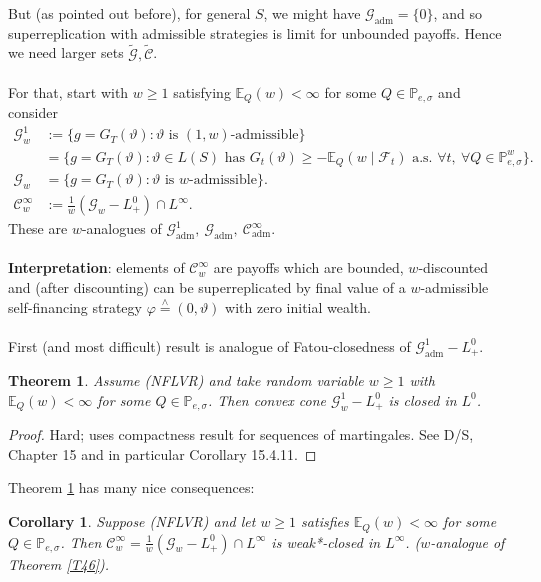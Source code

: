 \documentclass[12pt,a4paper, twoside]{article}
\newtheorem{thm}{Theorem}[section]
\newtheorem{cor}{Corollary}[section]
\theoremstyle{definition}
\newcommand{\EE}{\mathbb{E}} %
\newcommand{\PP}{\mathbb{P}} %
\newcommand{\teq}{\overset{\wedge}{=}}
\begin{document}
But (as pointed out before), for general $S$, we might have $\mathcal{G}_\text{adm}= \{0\}$, and so superreplication with admissible strategies is limit for unbounded payoffs. Hence we need larger sets $\widetilde{\mathcal{G}}, \widetilde{\mathcal{C}}$. \\
\\
For that, start with $w \geq 1$ satisfying $\EE_Q(w) < \infty$ for some $Q \in \PP_{e, \sigma}$ and consider 
\begin{align*}
\mathcal{G}_w^1 &:= \{ g = G_T( \vartheta) : \vartheta \text{ is $(1,w)$-admissible}\} \\
&= \{ g = G_T( \vartheta) : \vartheta \in L(S) \text{ has } G_t( \vartheta) \geq - \EE_Q(w \mid \mathcal{F}_t) \text{ a.s. } \forall t, \ \forall Q \in \PP_{e, \sigma}^w\}.  \\
\mathcal{G}_w &= \{ g = G_T( \vartheta) : \vartheta \text{ is $w$-admissible}\}. \\
\mathcal{C}_w^\infty &:= \frac{1}{w}( \mathcal{G}_w-L_+^0) \cap L^\infty. 
\end{align*}
These are $w$-analogues of $\mathcal{G}_\text{adm}^1, \ \mathcal{G}_\text{adm}, \ \mathcal{C}_\text{adm}^\infty$. 
\\\\
\textbf{Interpretation}: elements of $\mathcal{C}_w^\infty$ are payoffs which are bounded, $w$-discounted and (after discounting) can be superreplicated by final value of a $w$-admissible self-financing strategy $\varphi \teq (0, \vartheta)$ with zero initial wealth. 
\\\\
First (and most difficult) result is analogue of Fatou-closedness of $\mathcal{G}_\text{adm}^1-L_+^0$. 
\begin{thm} \label{T82} Assume (NFLVR) and take random variable $w \geq 1$ with $\EE_Q(w) < \infty$ for some $Q \in \PP_{e, \sigma}$. Then convex cone $\mathcal{G}_w^1-L_+^0$ is closed in $L^0$. 
\end{thm}
\begin{proof}
Hard; uses compactness result for sequences of martingales. See D/S, Chapter 15 and in particular Corollary 15.4.11.
\end{proof}
\newpage
Theorem \ref{T82} has many nice consequences:
\begin{cor} \label{C83} Suppose (NFLVR) and let $w \geq 1$ satisfies $\EE_Q(w) < \infty$ for some $Q \in \PP_{e,  \sigma}$. Then $\mathcal{C}_w^\infty = \frac{1}{w}( \mathcal{G}_w-L_+^0) \cap L^\infty$ is weak*-closed in $L^\infty$. ($w$-analogue of Theorem \ref{T46}). 
\end{cor}
\end{document}
